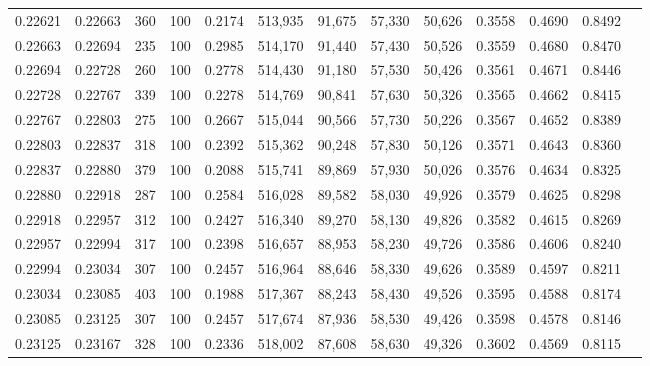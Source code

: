\begin{tabular}{rrrrrrrrrrrrr}
0.22621 & 0.22663 &   360 & 100 &                                     0.2174 & 513,935 &  91,675 &  57,330 &  50,626 & 0.3558 & 0.4690 & 0.8492 \\
0.22663 & 0.22694 &   235 & 100 &                                     0.2985 & 514,170 &  91,440 &  57,430 &  50,526 & 0.3559 & 0.4680 & 0.8470 \\
0.22694 & 0.22728 &   260 & 100 &                                     0.2778 & 514,430 &  91,180 &  57,530 &  50,426 & 0.3561 & 0.4671 & 0.8446 \\
0.22728 & 0.22767 &   339 & 100 &                                     0.2278 & 514,769 &  90,841 &  57,630 &  50,326 & 0.3565 & 0.4662 & 0.8415 \\
0.22767 & 0.22803 &   275 & 100 &                                     0.2667 & 515,044 &  90,566 &  57,730 &  50,226 & 0.3567 & 0.4652 & 0.8389 \\
0.22803 & 0.22837 &   318 & 100 &                                     0.2392 & 515,362 &  90,248 &  57,830 &  50,126 & 0.3571 & 0.4643 & 0.8360 \\
0.22837 & 0.22880 &   379 & 100 &                                     0.2088 & 515,741 &  89,869 &  57,930 &  50,026 & 0.3576 & 0.4634 & 0.8325 \\
0.22880 & 0.22918 &   287 & 100 &                                     0.2584 & 516,028 &  89,582 &  58,030 &  49,926 & 0.3579 & 0.4625 & 0.8298 \\
0.22918 & 0.22957 &   312 & 100 &                                     0.2427 & 516,340 &  89,270 &  58,130 &  49,826 & 0.3582 & 0.4615 & 0.8269 \\
0.22957 & 0.22994 &   317 & 100 &                                     0.2398 & 516,657 &  88,953 &  58,230 &  49,726 & 0.3586 & 0.4606 & 0.8240 \\
0.22994 & 0.23034 &   307 & 100 &                                     0.2457 & 516,964 &  88,646 &  58,330 &  49,626 & 0.3589 & 0.4597 & 0.8211 \\
0.23034 & 0.23085 &   403 & 100 &                                     0.1988 & 517,367 &  88,243 &  58,430 &  49,526 & 0.3595 & 0.4588 & 0.8174 \\
0.23085 & 0.23125 &   307 & 100 &                                     0.2457 & 517,674 &  87,936 &  58,530 &  49,426 & 0.3598 & 0.4578 & 0.8146 \\
0.23125 & 0.23167 &   328 & 100 &                                     0.2336 & 518,002 &  87,608 &  58,630 &  49,326 & 0.3602 & 0.4569 & 0.8115 \\

\end{tabular}
